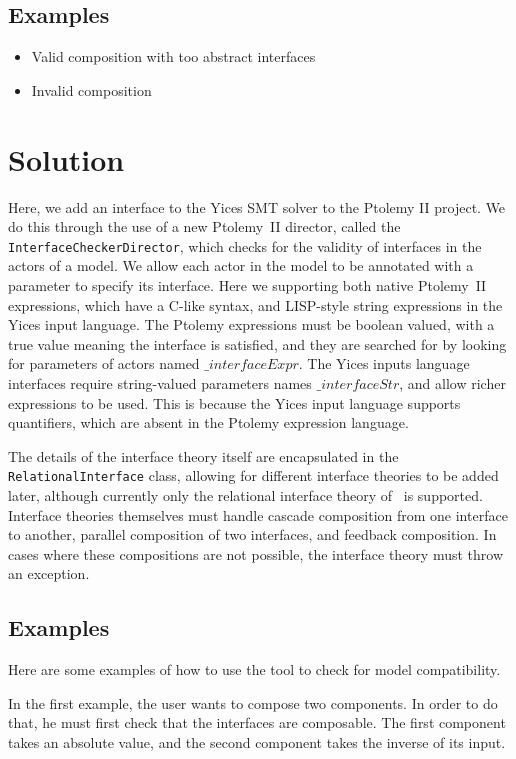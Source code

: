 \documentclass[preprint,11pt,authoryear]{sigplanconf}
\begin{document}
\subsection{Examples}
\begin{itemize}
	\item Valid composition with too abstract interfaces
	\item Invalid composition
\end{itemize}

\section{Solution}
Here, we add an interface to the Yices\cite{yices} SMT solver to the Ptolemy II\cite{ptII} project.
We do this through the use of a new Ptolemy~II director, called the \texttt{InterfaceCheckerDirector}, which checks for the validity of interfaces in the actors of a model.
We allow each actor in the model to be annotated with a parameter to specify its interface.
Here we supporting both native Ptolemy~II expressions, which have a C-like syntax, and LISP-style string expressions in the Yices input language.
The Ptolemy expressions must be boolean valued, with a true value meaning the interface is satisfied, and they are searched for by looking for parameters of actors named $\_interfaceExpr$.
The Yices inputs language interfaces require string-valued parameters names $\_interfaceStr$, and allow richer expressions to be used.
This is because the Yices input language supports quantifiers, which are absent in the Ptolemy expression language.

The details of the interface theory itself are encapsulated in the \texttt{RelationalInterface} class, allowing for different interface theories to be added later, although currently only the relational interface theory of~\cite{relationalInterfaces} is supported.
Interface theories themselves must handle cascade composition from one interface to another, parallel composition of two interfaces,
and feedback composition.  In cases where these compositions are not possible, the interface theory must throw an exception.

\subsection{Examples}
Here are some examples of how to use the tool to check for model compatibility.

In the first example, the user wants to compose two components.  In order to do that, he must first check that the interfaces are composable.  The first component takes an absolute value, and the second component takes the inverse of its input.
\end{document}

